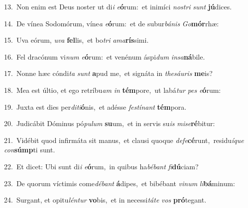 {\numbfont\textcolor{\numbcolor}{13.}}~Non enim est Deus noster ut di\textit{i} \textit{e}\-\textbf{ó}rum:~\star et inimíci \textit{nos}\-\textit{tri} \textit{sunt} \textbf{jú}\-dices.\par
{\numbfont\textcolor{\numbcolor}{14.}}~De vínea Sodomórum, víne\textit{a} \textit{e}\-\textbf{ó}rum:~\star et de subur\-\textit{bá}\-\textit{nis} \textit{Go}\-\textbf{mór}rhæ:\par
{\numbfont\textcolor{\numbcolor}{15.}}~Uva eórum, \textit{u}\-\textit{va} \textbf{fel}\-lis,~\star et bo\textit{tri} \textit{a}\-\textit{ma}\textbf{rís}simi.\par
{\numbfont\textcolor{\numbcolor}{16.}}~Fel dracónum vi\textit{num} \textit{e}\-\textbf{ó}rum:~\star et venénum áspi\textit{dum} \textit{in}\-\textit{sa}\textbf{ná}bile.\par
{\numbfont\textcolor{\numbcolor}{17.}}~Nonne hæc cóndi\textit{ta} \textit{sunt} \textbf{a}\-pud me,~\star et signáta in \textit{the}\-\textit{sáu}\textit{ris} \textbf{me}\-is?\par
{\numbfont\textcolor{\numbcolor}{18.}}~Mea est últio, et ego retríbu\textit{am} \textit{in} \textbf{tém}\-pore,~\star ut labá\textit{tur} \textit{pes} \textit{e}\-\textbf{ó}rum:\par
{\numbfont\textcolor{\numbcolor}{19.}}~Juxta est dies per\-\textit{di}\-\textit{ti}\textbf{ó}nis,~\star et adésse \textit{fes}\-\textit{tí}\textit{nant} \textbf{tém}\-pora.\par
{\numbfont\textcolor{\numbcolor}{20.}}~Judicábit Dóminus pó\-\textit{pu}\-\textit{lum} \textbf{su}\-um,~\star et in servis su\textit{is} \textit{mi}\-\textit{se}\textbf{ré}bitur:\par
{\numbfont\textcolor{\numbcolor}{21.}}~Vidébit quod infirmáta sit manus,~\dagger et clausi quoque \textit{de}\-\textit{fe}\textbf{cé}runt,~\star residu\-\textit{í}\-\textit{que} \textit{con}\-\textbf{súmp}ti sunt.\par
{\numbfont\textcolor{\numbcolor}{22.}}~Et dicet: Ubi sunt di\textit{i} \textit{e}\-\textbf{ó}rum,~\star in quibus ha\-\textit{bé}\-\textit{bant} \textit{fi}\-\textbf{dú}ciam?\par
{\numbfont\textcolor{\numbcolor}{23.}}~De quorum víctimis come\-\textit{dé}\-\textit{bant} \textbf{á}\-dipes,~\star et bibébant \textit{vi}\-\textit{num} \textit{li}\-\textbf{bá}minum:\par
{\numbfont\textcolor{\numbcolor}{24.}}~Surgant, et opitu\-\textit{lén}\-\textit{tur} \textbf{vo}\-bis,~\star et in necessi\-\textit{tá}\-\textit{te} \textit{vos} \textbf{pró}\-tegant.\par
